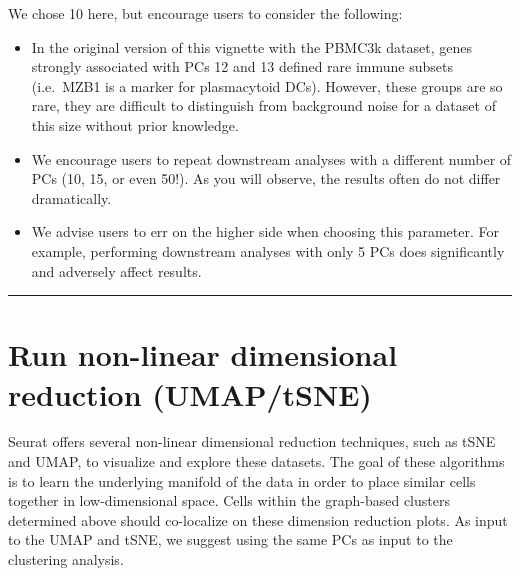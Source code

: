\documentclass[
]{book}
\providecommand{\tightlist}{%
  \setlength{\itemsep}{0pt}\setlength{\parskip}{0pt}}
\begin{document}
We chose 10 here, but encourage users to consider the following:

\begin{itemize}
\tightlist
\item
  In the original version of this vignette with the PBMC3k dataset, genes strongly associated with PCs 12 and 13 defined rare immune subsets (i.e.~MZB1 is a marker for plasmacytoid DCs). However, these groups are so rare, they are difficult to distinguish from background noise for a dataset of this size without prior knowledge.
\item
  We encourage users to repeat downstream analyses with a different number of PCs (10, 15, or even 50!). As you will observe, the results often do not differ dramatically.
\item
  We advise users to err on the higher side when choosing this parameter. For example, performing downstream analyses with only 5 PCs does significantly and adversely affect results.
\end{itemize}

\begin{center}\rule{0.5\linewidth}{0.5pt}\end{center}

\section{Run non-linear dimensional reduction (UMAP/tSNE)}\label{run-non-linear-dimensional-reduction-umaptsne}

Seurat offers several non-linear dimensional reduction techniques, such as tSNE and UMAP, to visualize and explore these datasets. The goal of these algorithms is to learn the underlying manifold of the data in order to place similar cells together in low-dimensional space. Cells within the graph-based clusters determined above should co-localize on these dimension reduction plots. As input to the UMAP and tSNE, we suggest using the same PCs as input to the clustering analysis.
\end{document}
